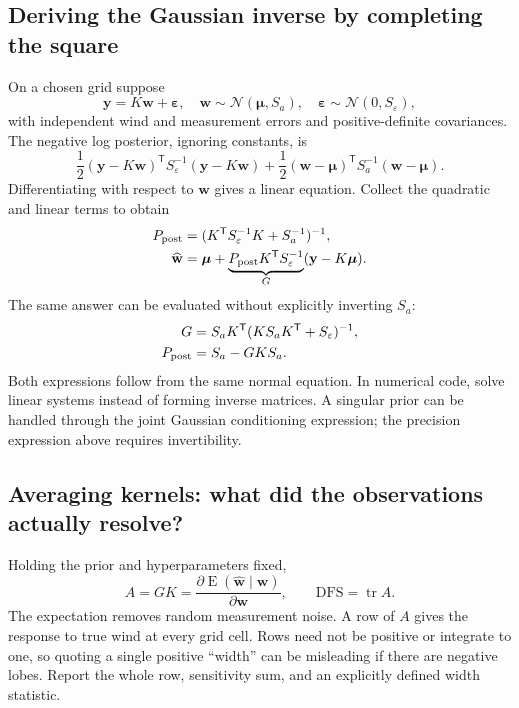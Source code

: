 \documentclass[11pt,a4paper]{article}
\numberwithin{equation}{section}
\begin{document}
\subsection{Deriving the Gaussian inverse by completing the square}
On a chosen grid suppose
\begin{equation}
 \mathbf y=K\mathbf w+\boldsymbol\varepsilon,
 \quad \mathbf w\sim\mathcal N(\boldsymbol\mu,S_a),
 \quad \boldsymbol\varepsilon\sim\mathcal N(0,S_\varepsilon),
\end{equation}
with independent wind and measurement errors and positive-definite covariances. The negative log posterior, ignoring constants, is
\begin{equation}
 \frac12(\mathbf y-K\mathbf w)^{\mathsf T}S_\varepsilon^{-1}(\mathbf y-K\mathbf w)
 +\frac12(\mathbf w-\boldsymbol\mu)^{\mathsf T}S_a^{-1}(\mathbf w-\boldsymbol\mu).
\end{equation}
Differentiating with respect to $\mathbf w$ gives a linear equation. Collect the quadratic and linear terms to obtain
\begin{align}
 P_{\rm post}&=(K^{\mathsf T}S_\varepsilon^{-1}K+S_a^{-1})^{-1},\\
 \widehat{\mathbf w}&=\boldsymbol\mu+
 \underbrace{P_{\rm post}K^{\mathsf T}S_\varepsilon^{-1}}_G
 (\mathbf y-K\boldsymbol\mu).
\end{align}
The same answer can be evaluated without explicitly inverting $S_a$:
\begin{align}
 G&=S_aK^{\mathsf T}(KS_aK^{\mathsf T}+S_\varepsilon)^{-1},\\
 P_{\rm post}&=S_a-GKS_a.
\end{align}
Both expressions follow from the same normal equation. In numerical code, solve linear systems instead of forming inverse matrices. A singular prior can be handled through the joint Gaussian conditioning expression; the precision expression above requires invertibility.

\subsection{Averaging kernels: what did the observations actually resolve?}
Holding the prior and hyperparameters fixed,
\begin{equation}
 \boxed{A=GK=\frac{\partial\operatorname E(\widehat{\mathbf w}\mid\mathbf w)}{\partial\mathbf w},
 \qquad \mathrm{DFS}=\operatorname{tr}A.}
\end{equation}
The expectation removes random measurement noise. A row of $A$ gives the response to true wind at every grid cell. Rows need not be positive or integrate to one, so quoting a single positive ``width'' can be misleading if there are negative lobes. Report the whole row, sensitivity sum, and an explicitly defined width statistic.
\end{document}
